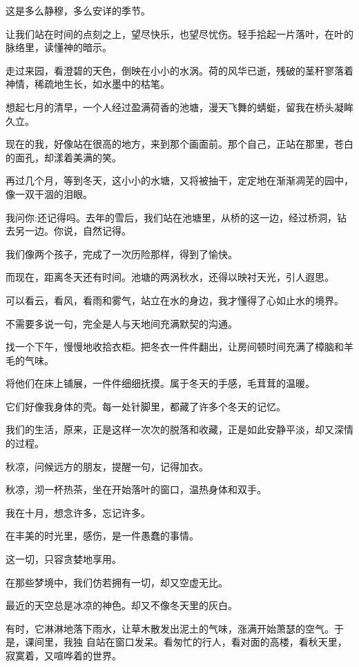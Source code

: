 		这是多么静穆，多么安详的季节。

		让我们站在时间的点刻之上，望尽快乐，也望尽忧伤。轻手拾起一片落叶，在叶的脉络里，读懂神的暗示。\par
		走过来园，看澄碧的天色，倒映在小小的水涡。荷的风华已逝，残破的茎秆寥落着神情，稀疏地生长，如水墨中的枯笔。\par
		想起七月的清早，一个人经过盈满荷香的池塘，漫天飞舞的蜻蜓，留我在桥头凝眸久立。\par
		现在的我，好像站在很高的地方，来到那个画面前。那个自己，正站在那里，苍白的面孔，却漾着美满的笑。\par
		再过几个月，等到冬天，这小小的水塘，又将被抽干，定定地在渐渐凋芜的园中，像一双干涸的泪眼。\par
		我问你:还记得吗。去年的雪后，我们站在池塘里，从桥的这一边，经过桥洞，钻去另一边。你说，自然记得。\par
		我们像两个孩子，完成了一次历险那样，得到了愉快。

		而现在，距离冬天还有时间。池塘的两涡秋水，还得以映衬天光，引人遐思。\par
		可以看云，看风，看雨和雾气，站立在水的身边，我才懂得了心如止水的境界。\par
		不需要多说一句，完全是人与天地间充满默契的沟通。

		找一个下午，慢慢地收拾衣柜。把冬衣一件件翻出，让房间顿时间充满了樟脑和羊毛的气味。\par
		将他们在床上铺展，一件件细细抚摸。属于冬天的手感，毛茸茸的温暖。\par
		它们好像我身体的壳。每一处针脚里，都藏了许多个冬天的记忆。\par
		我们的生活，原来，正是这样一次次的脱落和收藏，正是如此安静平淡，却又深情的过程。

		秋凉，问候远方的朋友，提醒一句，记得加衣。\par
		秋凉，沏一杯热茶，坐在开始落叶的窗口，温热身体和双手。\par
		我在十月，想念许多，忘记许多。\par
		在丰美的时光里，感伤，是一件愚蠢的事情。\par
		这一切，只容贪婪地享用。

	\endwriting



		在那些梦境中，我们仿若拥有一切，却又空虚无比。

		最近的天空总是冰凉的神色。却又不像冬天里的灰白。

		有时，它淋淋地落下雨水，让草木散发出泥土的气味，涨满开始萧瑟的空气。于是，课间里，我独
	自站在窗口发呆。看匆忙的行人，看对面的高楼，看秋天里，寂寞着，又喧哗着的世界。

